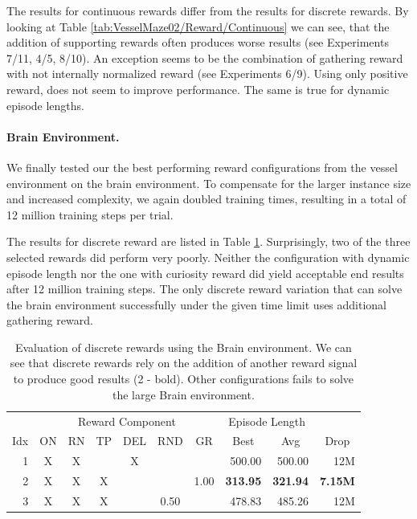 The results for continuous rewards differ from the results for discrete rewards. By looking at Table \ref{tab:VesselMaze02/Reward/Continuous} we can see, that the addition of supporting rewards often produces worse results (see Experiments 7/11, 4/5, 8/10). An exception seems to be the combination of gathering reward with not internally normalized reward (see Experiments 6/9). Using only positive reward, does not seem to improve performance. The same is true for dynamic episode lengths.  


\paragraph{Brain Environment.} We finally tested our the best performing reward configurations from the vessel environment on the brain environment. To compensate for the larger instance size and increased complexity, we again doubled training times, resulting in a total of 12 million training steps per trial. 

The results for discrete reward are listed in Table \ref{tab:Maze0122/Reward/Discrete}. Surprisingly, two of the three selected rewards did perform very poorly. Neither the configuration with dynamic episode length nor the one with curiosity reward did yield acceptable end results after 12 million training steps. The only discrete reward variation that can solve the brain environment successfully under the given time limit uses additional gathering reward. 


\begin{table}[htp]
    \begin{center}
        \begin{tabular}{rccccccrrr}
            \toprule
             & \multicolumn{6}{c}{Reward Component} & \multicolumn{2}{c}{Episode Length} & \\
            \cmidrule(lr){2-7}\cmidrule(lr){8-9}
            \multicolumn{1}{c}{Idx} & \multicolumn{1}{c}{ON} & \multicolumn{1}{c}{RN} & \multicolumn{1}{c}{TP} & \multicolumn{1}{c}{DEL} & \multicolumn{1}{c}{RND} & \multicolumn{1}{c}{GR} & \multicolumn{1}{c}{Best} & \multicolumn{1}{c}{Avg} & \multicolumn{1}{c}{Drop}\\
            \midrule
            1 & X & X &  & X &  &  & 500.00 & 500.00 & 12M \\
            2 & X & X & X &  &  & 1.00 & \textbf{313.95} & \textbf{321.94} & \textbf{7.15M} \\
            3 & X & X & X &  & 0.50 &  & 478.83 & 485.26 & 12M \\
            \bottomrule
        \end{tabular}
    \end{center}
    \caption[Evaluation of Discrete Rewards using the Brain Environment]{Evaluation of discrete rewards using the Brain environment. We can see that discrete rewards rely on the addition of another reward signal to produce good results (2 - bold). Other configurations fails to solve the large Brain environment.} \label{tab:Maze0122/Reward/Discrete}
\end{table}

